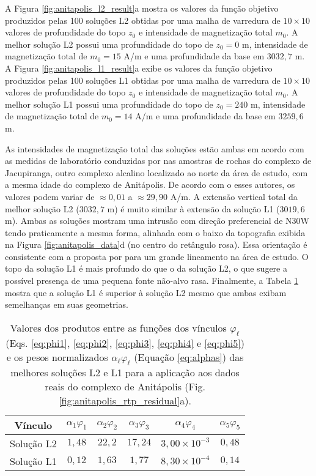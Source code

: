 A Figura \ref{fig:anitapolis_l2_result}a mostra os valores da função objetivo produzidos pelas 100 soluções L2 obtidas por uma malha de varredura de $10 \times 10$ valores de profundidade do topo $z_{0}$ e intensidade de magnetização total $m_{0}$.
A melhor solução L2 possui uma profundidade do topo de $z_{0} = 0$ m, intensidade de magnetização total de $m_{0} = 15$ A/m e uma profundidade da base em $3032,7$ m.
A Figura \ref{fig:anitapolis_l1_result}a exibe os valores da função objetivo produzidos pelas 100 soluções L1 obtidas por uma malha de varredura de $10 \times 10$ valores de profundidade do topo $z_{0}$ e intensidade de magnetização total $m_{0}$.
A melhor solução L1 possui uma profundidade do topo de $z_{0} = 240$ m, intensidade de magnetização total de $m_{0} = 14$ A/m e uma profundidade da base em $3259,6$ m.

As intensidades de magnetização total das soluções estão ambas em acordo com as medidas de laboratório conduzidas por \citet{valdivia_etal2009} nas amostras de rochas do complexo de Jacupiranga, outro complexo alcalino localizado ao norte da área de estudo, com a mesma idade do complexo de Anitápolis. De acordo com o esses autores,
os valores podem variar de $\approx 0,01$ a $\approx 29,90$ A/m.
A extensão vertical total da melhor solução L2 ($3032,7$ m) é muito similar à extensão da solução L1 ($3019,6$ m). 
Ambas as soluções mostram uma intrusão com direção preferencial de N30W tendo praticamente a mesma forma,
alinhada com o baixo da topografia exibida na Figura \ref{fig:anitapolis_data}d (no centro do retângulo rosa). 
Essa orientação é consistente com a proposta por \citet{horbach_marimon1980} para um grande lineamento na área de estudo.
O topo da solução L1 é mais profundo do que o da solução L2, 
o que sugere a possível presença de uma pequena fonte não-alvo rasa.
Finalmente, a Tabela \ref{tab:anitapolis} mostra que a solução L1 é superior à solução L2 mesmo que ambas exibam semelhanças em suas geometrias.

\begin{table}[h]\label{tab:anitapolis}
	\caption{Valores dos produtos entre as funções dos vínculos $ \varphi_{\ell} $ (Eqs. \ref{eq:phi1}, \ref{eq:phi2}, \ref{eq:phi3}, \ref{eq:phi4} e \ref{eq:phi5}) e os pesos normalizados $ \alpha_\ell \varphi_\ell  $ (Equação \ref{eq:alphas}) das melhores soluções L2 e L1 para a aplicação aos dados reais do complexo de Anitápolis (Fig. \ref{fig:anitapolis_rtp_residual}a).}
	\centering
	\vspace{0.5cm}
	\begin{tabular}{c|ccccc}
		Vínculo & $ \alpha_{1}\varphi _1 $ & $ \alpha_{2}\varphi _2 $ &  $ \alpha_{3}\varphi _3 $ &  $ \alpha_{4}\varphi _4 $ &  $ \alpha_{5}\varphi _5 $ \\
		\hline
		Solução L2 & $ 1,48 $ & $ 22,2 $ & $ 17,24 $ & $3,00\times 10^{-3} $ & $ 0,48 $ \\ 
		Solução L1 & $ 0,12 $ & $ 1,63 $ & $ 1,77 $ & $8,30\times 10^{-4} $ & $ 0,14 $
	\end{tabular}
\end{table}

